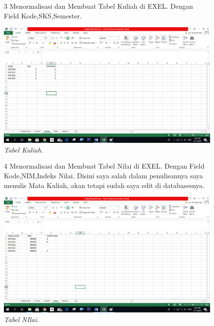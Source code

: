 \begin{enumerate}
\begin{figure}
\item[3]Menormalisasi dan Membuat Tabel Kuliah di EXEL. Dengan Field Kode,SKS,Semester.

    \begin{center}
    \includegraphics[scale=0.5]{figures/3.png}
    \caption{\textit{Tabel Kuliah.}}
    \end{center}
    \label{gambar}
    \end{figure}

\begin{figure}
\item[4]Menormalisasi dan Membuat Tabel Nilai di EXEL. Dengan Field Kode,NIM,Indeks Nilai. Disini saya salah dalam penulisannya saya menulis Mata Kuliah, akan tetapi sudah saya edit di databasesnya. 

    \begin{center}
    \includegraphics[scale=0.5]{figures/4.png}
    \caption{\textit{Tabel NIlai.}}
    \end{center}
    \label{gambar}
    \end{figure}


\end{enumerate}
